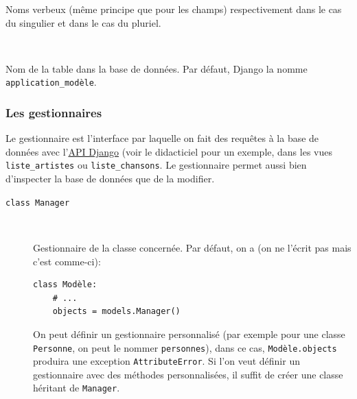\documentclass[a4paper, 10pt]{article}
\begin{document}
{\begin{description}
	      Noms verbeux (même principe que pour les champs) respectivement dans le cas du singulier et dans le cas du pluriel.

	\item[\texttt{db_table}]~

	      Nom de la table dans la base de données. Par défaut, Django la nomme \texttt{application\_modèle}.
\end{description}

\subsubsection{Les gestionnaires}
Le gestionnaire  est l'interface par laquelle on fait des requêtes à la base de données avec l'\href{https://docs.djangoproject.com/fr/2.0/topics/db/queries/}{API Django} (voir le didacticiel pour un exemple, dans les vues \texttt{liste\_artistes} ou \texttt{liste\_chansons}. Le gestionnaire permet aussi bien d'inspecter la base de données que de la modifier.

\begin{description}
	\item[\texttt{class Manager}]~

	      Gestionnaire de la classe concernée. Par défaut, on a (on ne l'écrit pas mais c'est comme-ci):
	      \begin{verbatim}
class Modèle:
    # ...
    objects = models.Manager()
    \end{verbatim}

	      On peut définir un gestionnaire personnalisé (par exemple pour une classe \texttt{Personne}, on peut le nommer \texttt{personnes}), dans ce cas, \texttt{Modèle.objects} produira une exception \texttt{AttributeError}. Si l'on veut définir un gestionnaire avec des méthodes personnalisées, il suffit de créer une classe héritant de \texttt{Manager}.
\end{description}

}
\end{document}
